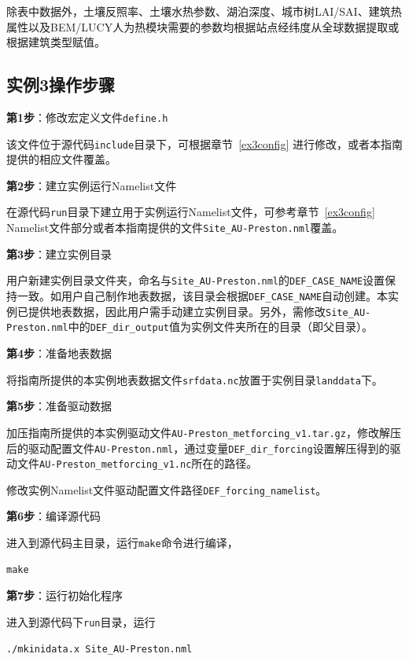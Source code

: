 除表中数据外，土壤反照率、土壤水热参数、湖泊深度、城市树LAI/SAI、建筑热属性以及BEM/LUCY人为热模块需要的参数均根据站点经纬度从全球数据提取或根据建筑类型赋值。

\subsection{实例3操作步骤}

\textbf{第1步}：修改宏定义文件\texttt{define.h}

该文件位于源代码\texttt{include}目录下，可根据章节~\ref{ex3config} 进行修改，或者本指南提供的相应文件覆盖。

\bigskip
\textbf{第2步}：建立实例运行Namelist文件

在源代码\texttt{run}目录下建立用于实例运行Namelist文件，可参考章节~\ref{ex3config} Namelist文件部分或者本指南提供的文件\texttt{Site\_AU-Preston.nml}覆盖。

\bigskip
\textbf{第3步}：建立实例目录

用户新建实例目录文件夹，命名与\texttt{Site\_AU-Preston.nml}的\texttt{DEF\_CASE\_NAME}设置保持一致。如用户自己制作地表数据，该目录会根据\texttt{DEF\_CASE\_NAME}自动创建。本实例已提供地表数据，因此用户需手动建立实例目录。另外，需修改\texttt{Site\_AU-Preston.nml}中的\texttt{DEF\_dir\_output}值为实例文件夹所在的目录（即父目录）。

\bigskip
\textbf{第4步}：准备地表数据

将指南所提供的本实例地表数据文件\texttt{srfdata.nc}放置于实例目录\texttt{landdata}下。

\bigskip
\textbf{第5步}：准备驱动数据

加压指南所提供的本实例驱动文件\texttt{AU-Preston\_metforcing\_v1.tar.gz}，修改解压后的驱动配置文件\texttt{AU-Preston.nml}，通过变量\texttt{DEF\_dir\_forcing}设置解压得到的驱动文件\texttt{AU-Preston\_metforcing\_v1.nc}所在的路径。

修改实例Namelist文件驱动配置文件路径\texttt{DEF\_forcing\_namelist}。

\bigskip
\textbf{第6步}：编译源代码

进入到源代码主目录，运行\texttt{make}命令进行编译，
\begin{lstlisting}
make
\end{lstlisting}

\bigskip
\textbf{第7步}：运行初始化程序

进入到源代码下\texttt{run}目录，运行
\begin{lstlisting}
./mkinidata.x Site_AU-Preston.nml
\end{lstlisting}


